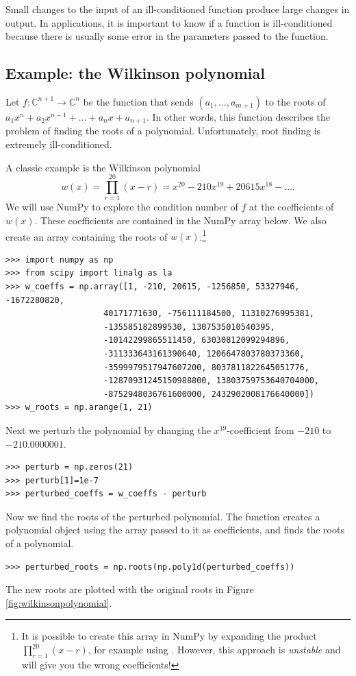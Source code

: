 Small changes to the input of an ill-conditioned function produce large changes in output.
In applications, it is important to know if a function is ill-conditioned because there is usually some error in the parameters passed to the function.

\subsection*{Example: the Wilkinson polynomial}
Let $f:\mathbb{C}^{n+1} \rightarrow \mathbb{C}^n$ be the function that sends $(a_1, \ldots, a_{m+1})$ to the roots of $a_1x^n+a_2x^{n-1}+\ldots+a_nx+a_{n+1}$.
In other words, this function describes the problem of finding the roots of a polynomial.
Unfortunately, root finding is extremely ill-conditioned.

A classic example is the Wilkinson polynomial 
\[
w(x) = \prod_{r=1}^{20}(x-r) = x^{20}-210x^{19}+20615x^{18}-\ldots.
\]
We will use NumPy to explore the condition number of $f$ at the coefficients of $w(x)$.
These coefficients are contained in the NumPy array  below.
We also create an array  containing the roots of $w(x)$.\footnote{
It is possible to create this array in NumPy by expanding the product $\prod_{r=1}^{20}(x-r)$, for example using .
However, this approach is \emph{unstable} and will give you the wrong coefficients!}
\begin{lstlisting}
>>> import numpy as np
>>> from scipy import linalg as la
>>> w_coeffs = np.array([1, -210, 20615, -1256850, 53327946, -1672280820,
                    40171771630, -756111184500, 11310276995381,
                    -135585182899530, 1307535010540395,
                    -10142299865511450, 63030812099294896,
                    -311333643161390640, 1206647803780373360,
                    -3599979517947607200, 8037811822645051776,
                    -12870931245150988800, 13803759753640704000,
                    -8752948036761600000, 2432902008176640000])
>>> w_roots = np.arange(1, 21)
\end{lstlisting}

Next we perturb the polynomial by changing the $x^{19}$-coefficient from $-210$ to $-210.0000001$.
\begin{lstlisting}
>>> perturb = np.zeros(21)
>>> perturb[1]=1e-7
>>> perturbed_coeffs = w_coeffs - perturb
\end{lstlisting}

Now we find the roots of the perturbed polynomial.
The function  creates a polynomial object using the array passed to it as coefficients, and  finds the roots of a polynomial.
\begin{lstlisting}
>>> perturbed_roots = np.roots(np.poly1d(perturbed_coeffs))
\end{lstlisting}
The new roots are plotted with the original roots in Figure \ref{fig:wilkinsonpolynomial}.

